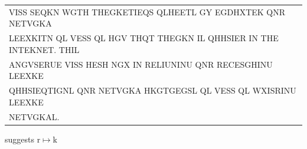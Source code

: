 \documentclass[aspectratio=169, lualatex, handout, 10pt,dvipsnames,svgnames]{beamer} %
\def\enbleu#1{\textcolor{bleu}{#1}}
\begin{document}
\begin{frame}
{\begin{tabular}[t]{l}
      V\enbleu{I}SS S\enbleu{E}QK\enbleu{N} WG\enbleu{T}\enbleu{H} \enbleu{T}\enbleu{H}\enbleu{E}GK\enbleu{E}\enbleu{T}\enbleu{I}EQS QLH\enbleu{E}E\enbleu{T}L GY EGDHX\enbleu{T}\enbleu{E}K Q\enbleu{N}R \enbleu{N}\enbleu{E}\enbleu{T}VGKA \\
      L\enbleu{E}EXK\enbleu{I}\enbleu{T}N QL V\enbleu{E}SS QL \enbleu{H}GV \enbleu{T}\enbleu{H}Q\enbleu{T} \enbleu{T}\enbleu{H}\enbleu{E}GKN \enbleu{I}L QHHS\enbleu{I}\enbleu{E}R \enbleu{I}\enbleu{N} \enbleu{T}\enbleu{H}\enbleu{E} \enbleu{I}\enbleu{N}\enbleu{T}\enbleu{E}K\enbleu{N}\enbleu{E}\enbleu{T}. \enbleu{T}\enbleu{H}\enbleu{I}L \\
      A\enbleu{N}GVS\enbleu{E}RU\enbleu{E} V\enbleu{I}SS \enbleu{H}\enbleu{E}SH NGX \enbleu{I}\enbleu{N} R\enbleu{E}L\enbleu{I}U\enbleu{N}\enbleu{I}\enbleu{N}U Q\enbleu{N}R R\enbleu{E}C\enbleu{E}SGH\enbleu{I}\enbleu{N}U L\enbleu{E}EXK\enbleu{E} \\
      QHHS\enbleu{I}EQ\enbleu{T}\enbleu{I}G\enbleu{N}L Q\enbleu{N}R \enbleu{N}\enbleu{E}\enbleu{T}VGKA HKG\enbleu{T}GEGSL QL V\enbleu{E}SS QL WX\enbleu{I}SR\enbleu{I}\enbleu{N}U L\enbleu{E}EXK\enbleu{E} \\
      \enbleu{N}\enbleu{E}\enbleu{T}VGKAL.
    \end{tabular}
  }
  \vspace{0.5cm}

  \normalsize
  \pause
  
  suggests r$\mapsto$k
  \color{black}
\end{frame}
\end{document}
